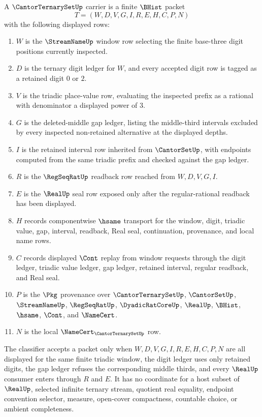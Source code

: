 \begin{definition}
\label{def:cantor-ternary-set-carrier}
A $\CantorTernarySetUp$ carrier is a finite $\BHist$ packet
$$
T=(W,D,V,G,I,R,E,H,C,P,N)
$$
with the following displayed rows:
\begin{enumerate}
\item $W$ is the $\StreamNameUp$ window row selecting the finite base-three digit positions currently inspected.
\item $D$ is the ternary digit ledger for $W$, and every accepted digit row is tagged as a retained digit $0$ or $2$.
\item $V$ is the triadic place-value row, evaluating the inspected prefix as a rational with denominator a displayed power of $3$.
\item $G$ is the deleted-middle gap ledger, listing the middle-third intervals excluded by every inspected non-retained alternative at the displayed depths.
\item $I$ is the retained interval row inherited from $\CantorSetUp$, with endpoints computed from the same triadic prefix and checked against the gap ledger.
\item $R$ is the $\RegSeqRatUp$ readback row reached from $W,D,V,G,I$.
\item $E$ is the $\RealUp$ seal row exposed only after the regular-rational readback has been displayed.
\item $H$ records componentwise $\hsame$ transport for the window, digit, triadic value, gap, interval, readback, Real seal, continuation, provenance, and local name rows.
\item $C$ records displayed $\Cont$ replay from window requests through the digit ledger, triadic value ledger, gap ledger, retained interval, regular readback, and Real seal.
\item $P$ is the $\Pkg$ provenance over $\CantorTernarySetUp$, $\CantorSetUp$, $\StreamNameUp$, $\RegSeqRatUp$, $\DyadicRatCoreUp$, $\RealUp$, $\BHist$, $\hsame$, $\Cont$, and $\NameCert$.
\item $N$ is the local $\NameCert_{\CantorTernarySetUp}$ row.
\end{enumerate}
The classifier accepts a packet only when $W,D,V,G,I,R,E,H,C,P,N$ are all displayed for the same finite triadic window, the digit ledger uses only retained digits, the gap ledger refuses the corresponding middle thirds, and every $\RealUp$ consumer enters through $R$ and $E$. It has no coordinate for a host subset of $\RealUp$, selected infinite ternary stream, quotient real equality, endpoint convention selector, measure, open-cover compactness, countable choice, or ambient completeness.
\end{definition}

